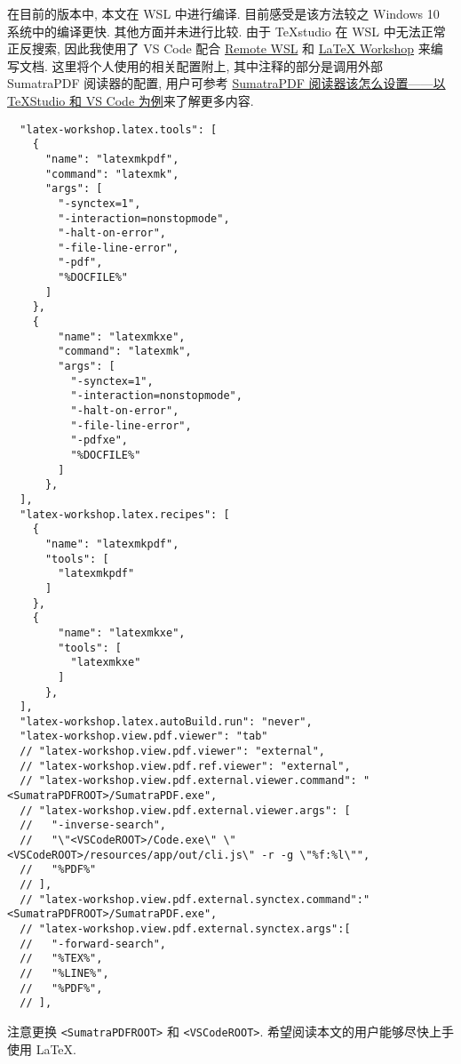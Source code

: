 在目前的版本中, 本文在 WSL 中进行编译.
目前感受是该方法较之 Windows 10 系统中的编译更快.
其他方面并未进行比较.
由于 \TeX studio 在 WSL 中无法正常正反搜索,
因此我使用了 VS Code 配合
\href{https://marketplace.visualstudio.com/items?itemName=ms-vscode-remote.remote-wsl}{Remote WSL}
和
\href{https://marketplace.visualstudio.com/items?itemName=James-Yu.latex-workshop}{\LaTeX{} Workshop}
来编写文档.
这里将个人使用的相关配置附上,
其中注释的部分是调用外部 SumatraPDF 阅读器的配置,
用户可参考 \href{https://wenda.latexstudio.net/article-5055.html}{SumatraPDF 阅读器该怎么设置——以 TeXStudio 和 VS Code 为例}来了解更多内容.
\begin{lstlisting}
  "latex-workshop.latex.tools": [
    {
      "name": "latexmkpdf",
      "command": "latexmk",
      "args": [
        "-synctex=1",
        "-interaction=nonstopmode",
        "-halt-on-error",
        "-file-line-error",
        "-pdf",
        "%DOCFILE%"
      ]
    },
    {
        "name": "latexmkxe",
        "command": "latexmk",
        "args": [
          "-synctex=1",
          "-interaction=nonstopmode",
          "-halt-on-error",
          "-file-line-error",
          "-pdfxe",
          "%DOCFILE%"
        ]
      },
  ],
  "latex-workshop.latex.recipes": [
    {
      "name": "latexmkpdf",
      "tools": [
        "latexmkpdf"
      ]
    },
    {
        "name": "latexmkxe",
        "tools": [
          "latexmkxe"
        ]
      },
  ],
  "latex-workshop.latex.autoBuild.run": "never",
  "latex-workshop.view.pdf.viewer": "tab"
  // "latex-workshop.view.pdf.viewer": "external",
  // "latex-workshop.view.pdf.ref.viewer": "external",
  // "latex-workshop.view.pdf.external.viewer.command": "<SumatraPDFROOT>/SumatraPDF.exe",
  // "latex-workshop.view.pdf.external.viewer.args": [
  //   "-inverse-search",
  //   "\"<VSCodeROOT>/Code.exe\" \"<VSCodeROOT>/resources/app/out/cli.js\" -r -g \"%f:%l\"",
  //   "%PDF%"
  // ],
  // "latex-workshop.view.pdf.external.synctex.command":"<SumatraPDFROOT>/SumatraPDF.exe",
  // "latex-workshop.view.pdf.external.synctex.args":[
  //   "-forward-search",
  //   "%TEX%",
  //   "%LINE%",
  //   "%PDF%",
  // ],
\end{lstlisting}
注意更换 \texttt{<SumatraPDFROOT>} 和 \texttt{<VSCodeROOT>}.
希望阅读本文的用户能够尽快上手使用 \LaTeX.
